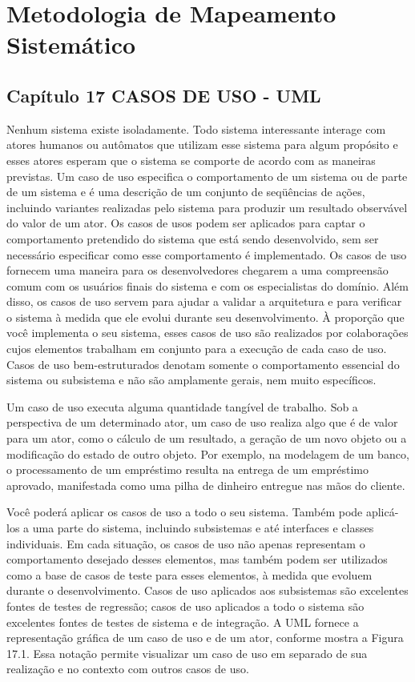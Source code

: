 \documentclass[12pt,a4paper]{article}
\begin{document}

\section{Metodologia de Mapeamento Sistemático}
\subsection{Capítulo 17
CASOS DE USO - UML}
Nenhum sistema existe isoladamente. Todo sistema interessante interage
com atores humanos ou autômatos que utilizam esse sistema para algum propósito e esses atores esperam que o sistema se comporte de acordo com as maneiras previstas. Um caso de uso especifica o comportamento de um sistema ou de
parte de um sistema e é uma descrição de um conjunto de seqüências de ações,
incluindo variantes realizadas pelo sistema para produzir um resultado observável do valor de um ator.
Os casos de usos podem ser aplicados para captar o comportamento pretendido do sistema que está sendo desenvolvido, sem ser necessário especificar
como esse comportamento é implementado. Os casos de uso fornecem uma maneira para os desenvolvedores chegarem a uma compreensão comum com os
usuários finais do sistema e com os especialistas do domínio. Além disso, os casos de uso servem para ajudar a validar a arquitetura e para verificar o sistema à
medida que ele evolui durante seu desenvolvimento. À proporção que você implementa o seu sistema, esses casos de uso são realizados por colaborações cujos
elementos trabalham em conjunto para a execução de cada caso de uso.
Casos de uso bem-estruturados denotam somente o comportamento essencial do sistema ou subsistema e não são amplamente gerais, nem muito específicos.

Um caso de uso executa alguma quantidade tangível de trabalho. Sob a
perspectiva de um determinado ator, um caso de uso realiza algo que é de valor
para um ator, como o cálculo de um resultado, a geração de um novo objeto ou
a modificação do estado de outro objeto. Por exemplo, na modelagem de um
banco, o processamento de um empréstimo resulta na entrega de um empréstimo aprovado, manifestada como uma pilha de dinheiro entregue nas mãos do
cliente.

Você poderá aplicar os casos de uso a todo o seu sistema. Também pode
aplicá-los a uma parte do sistema, incluindo subsistemas e até interfaces e classes
individuais. Em cada situação, os casos de uso não apenas representam o comportamento desejado desses elementos, mas também podem ser utilizados como
a base de casos de teste para esses elementos, à medida que evoluem durante o
desenvolvimento. Casos de uso aplicados aos subsistemas são excelentes fontes
de testes de regressão; casos de uso aplicados a todo o sistema são excelentes
fontes de testes de sistema e de integração. A UML fornece a representação gráfica de um caso de uso e de um ator, conforme mostra a Figura 17.1. Essa notação permite visualizar um caso de uso em separado de sua realização e no contexto com outros casos de uso.
\newpage

\printbibliography
\end{document}
